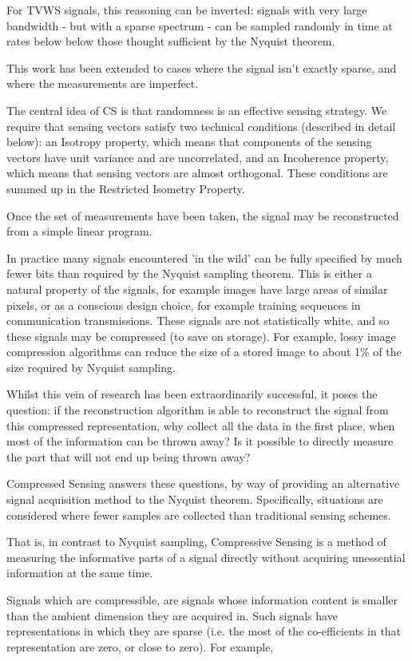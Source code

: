 For TVWS signals, this reasoning can be inverted: signals with very large bandwidth - but with a sparse spectrum - can be sampled randomly in time at rates below below those thought sufficient by the Nyquist theorem.

This work has been extended to cases where the signal isn't exactly sparse, and where the measurements are imperfect.

The central idea of CS is that randomness is an effective sensing strategy. We require that sensing vectors satisfy two technical conditions (described in detail below): an Isotropy property, which means that components of the sensing vectors have unit variance and are uncorrelated, and an Incoherence property, which means that sensing vectors are almost orthogonal. These conditions are summed up in the Restricted Isometry Property.

Once the set of measurements have been taken, the signal may be reconstructed from a simple linear program.

In practice many signals encountered 'in the wild' can be fully specified by much fewer bits than required by the Nyquist sampling theorem. This is either a natural property of the signals, for example images have large areas of similar pixels, or as a conscious design choice, for example training sequences in communication transmissions. These signals are not statistically white, and so these signals may be compressed (to save on storage). For example, lossy image compression algorithms can reduce the size of a stored image to about 1\% of the size required by Nyquist sampling. 

Whilst this vein of research has been extraordinarily successful, it poses the question: if the reconstruction algorithm is able to reconstruct the signal from this compressed representation, why collect all the data in the first place, when most of the information can be thrown away? Is it possible to directly measure the part that will not end up being thrown away?

Compressed Sensing answers these questions, by way of providing an alternative signal acquisition method to the Nyquist theorem. Specifically, situations are considered where fewer samples are collected than traditional sensing schemes. 

That is, in contrast to Nyquist sampling, Compressive Sensing is a method of measuring the informative parts of a signal directly without acquiring unessential information at the same time. 

Signals which are compressible, are signals whose information content is smaller than the ambient dimension they are acquired in. Such signals have representations in which they are sparse (i.e. the most of the co-efficients in that representation are zero, or close to zero). For example, 

